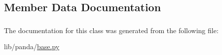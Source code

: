\subsection{Member Data Documentation}
\hypertarget{classpanda_1_1base_1_1Definition_af1a606bda27e895cab03785d996c8545}{
\subsubsection[{matches}]{}}
\label{classpanda_1_1base_1_1Definition_af1a606bda27e895cab03785d996c8545}


The documentation for this class was generated from the following file:\begin{DoxyCompactItemize}
\item 
lib/panda/\hyperlink{base_8py}{base.py}\end{DoxyCompactItemize}
